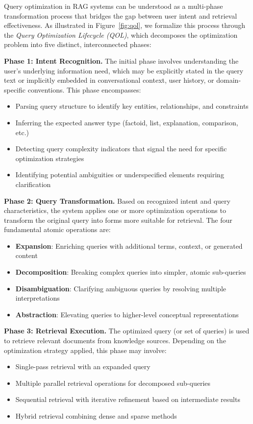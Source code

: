 \documentclass{article}
\begin{document}
Query optimization in RAG systems can be understood as a multi-phase transformation process that bridges the gap between user intent and retrieval effectiveness. As illustrated in Figure~\ref{fig:qol}, we formalize this process through the \textit{Query Optimization Lifecycle (QOL)}, which decomposes the optimization problem into five distinct, interconnected phases:

\textbf{Phase 1: Intent Recognition.} The initial phase involves understanding the user's underlying information need, which may be explicitly stated in the query text or implicitly embedded in conversational context, user history, or domain-specific conventions. This phase encompasses:
\begin{itemize}[leftmargin=*,nosep]
    \item Parsing query structure to identify key entities, relationships, and constraints
    \item Inferring the expected answer type (factoid, list, explanation, comparison, etc.)
    \item Detecting query complexity indicators that signal the need for specific optimization strategies
    \item Identifying potential ambiguities or underspecified elements requiring clarification
\end{itemize}

\textbf{Phase 2: Query Transformation.} Based on recognized intent and query characteristics, the system applies one or more optimization operations to transform the original query into forms more suitable for retrieval. The four fundamental atomic operations are:
\begin{itemize}[leftmargin=*,nosep]
    \item \textbf{Expansion}: Enriching queries with additional terms, context, or generated content
    \item \textbf{Decomposition}: Breaking complex queries into simpler, atomic sub-queries
    \item \textbf{Disambiguation}: Clarifying ambiguous queries by resolving multiple interpretations
    \item \textbf{Abstraction}: Elevating queries to higher-level conceptual representations
\end{itemize}

\textbf{Phase 3: Retrieval Execution.} The optimized query (or set of queries) is used to retrieve relevant documents from knowledge sources. Depending on the optimization strategy applied, this phase may involve:
\begin{itemize}[leftmargin=*,nosep]
    \item Single-pass retrieval with an expanded query
    \item Multiple parallel retrieval operations for decomposed sub-queries
    \item Sequential retrieval with iterative refinement based on intermediate results
    \item Hybrid retrieval combining dense and sparse methods
\end{itemize}
\end{document}
